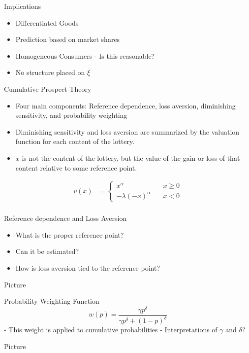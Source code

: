 \documentclass[presentation]{beamer}
\begin{document}
\begin{frame}[label={sec:orgc150867}]{Implications}
\begin{itemize}
\item Differentiated Goods
\item Prediction based on market shares
\item Homogeneous Consumers - Is this reasonable?
\item No structure placed on \(\xi\)
\end{itemize}
\end{frame}



\begin{frame}[label={sec:org7331512}]{Cumulative Prospect Theory}
\begin{itemize}
\item Four main components: Reference dependence, loss aversion,
diminishing sensitivity, and probability weighting

\item Diminishing sensitivity and loss aversion are summarized by the
valuation function for each content of the lottery.
\item \(x\) is not the content of the lottery, but the value of the gain or
loss of that content relative to some reference point.
\end{itemize}
\begin{align*}
  v(x) &=
  \begin{cases}
    x^\alpha \quad &x \geq 0\\
    -\lambda(-x)^\alpha \quad &x < 0
  \end{cases}\\
\end{align*}
\end{frame}

\begin{frame}[label={sec:org8b4dc3b}]{Reference dependence and Loss Aversion}
\begin{itemize}
\item What is the proper reference point?
\item Can it be estimated?
\item How is loss aversion tied to the reference point?
\end{itemize}

Picture
\end{frame}

\begin{frame}[label={sec:org6fc5bdd}]{Probability Weighting Function}
\begin{equation*}
  w(p) = \frac{\gamma p^{\delta}}{\gamma p^{\delta} + (1-p)^{\delta}}
\end{equation*}
- This weight is applied to cumulative probabilities
- Interpretations of $\gamma$ and $\delta$?

Picture
\end{frame}
\end{document}
